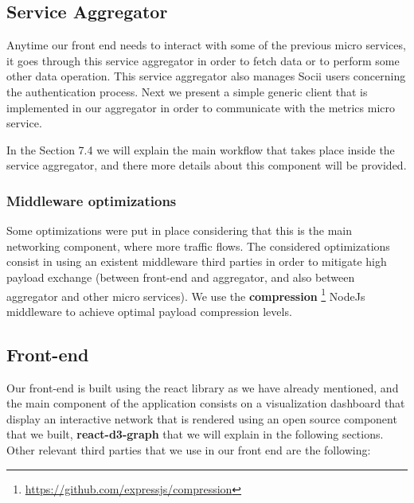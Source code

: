

\subsection{Service Aggregator}
Anytime our front end needs to interact with some of the previous micro services, it goes through this service aggregator
in order to fetch data or to perform some other data operation. This service aggregator also manages Socii users concerning the authentication process.
Next we present a simple generic client that is implemented in our aggregator in order to communicate with the metrics micro service.



In the Section 7.4 we will explain the main workflow that takes place inside the service aggregator, and there more details about this component will be provided.

\subsubsection{Middleware optimizations}
Some optimizations were put in place considering that this is the main networking component, where more traffic flows. The considered optimizations consist in using an existent middleware third parties in order to mitigate high payload exchange (between front-end and aggregator, and also between aggregator and other micro services). We use the \textbf{compression} \footnote{\url{https://github.com/expressjs/compression}} NodeJs middleware to achieve optimal payload compression levels.

\subsection{Front-end}

Our front-end is built using the react library as we have already mentioned, and the main component of the application consists on a visualization dashboard that display an interactive network that is rendered using an open source component that we built, \textbf{react-d3-graph} \citep{reactd3graph} that we will explain in the following sections. Other relevant third parties that we use in our front end are the following:

